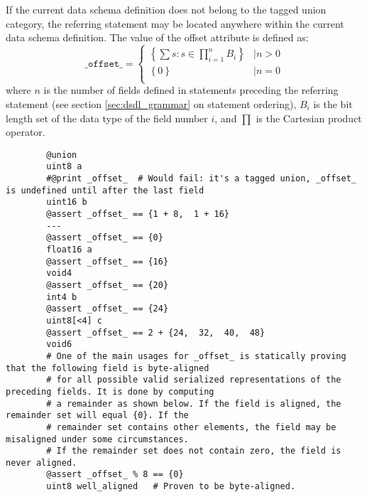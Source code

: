 If the current data schema definition does not belong to the tagged union category,
the referring statement may be located anywhere within the current data schema definition.
The value of the offset attribute is defined as:
$$
    \texttt{\_offset\_} =
    \begin{cases}
        \left\{ \sum s : s \in \prod\limits_{i=1}^{n} B_i \right\} &\mid n > 0 \\
        \left\{0\right\}                                           &\mid n = 0 \\
    \end{cases}
$$
where $n$ is the number of fields defined in statements preceding the referring statement
(see section \ref{sec:dsdl_grammar} on statement ordering),
$B_i$ is the bit length set of the data type of the field number $i$,
and $\prod$ is the Cartesian product operator.

\begin{remark}
    \begin{verbatim}
        @union
        uint8 a
        #@print _offset_  # Would fail: it's a tagged union, _offset_ is undefined until after the last field
        uint16 b
        @assert _offset_ == {1 + 8,  1 + 16}
        ---
        @assert _offset_ == {0}
        float16 a
        @assert _offset_ == {16}
        void4
        @assert _offset_ == {20}
        int4 b
        @assert _offset_ == {24}
        uint8[<4] c
        @assert _offset_ == 2 + {24,  32,  40,  48}
        void6
        # One of the main usages for _offset_ is statically proving that the following field is byte-aligned
        # for all possible valid serialized representations of the preceding fields. It is done by computing
        # a remainder as shown below. If the field is aligned, the remainder set will equal {0}. If the
        # remainder set contains other elements, the field may be misaligned under some circumstances.
        # If the remainder set does not contain zero, the field is never aligned.
        @assert _offset_ % 8 == {0}
        uint8 well_aligned   # Proven to be byte-aligned.
    \end{verbatim}
\end{remark}

